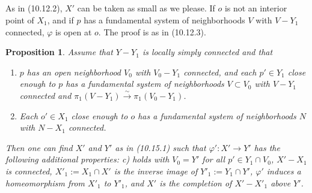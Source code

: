 \documentclass[12pt,a4paper]{article}
\theoremstyle{plain}
\newtheorem{proposition}[theorem]{Proposition}
\theoremstyle{definition}
\theoremstyle{remark}
\begin{document}
\subsection{}
\label{10.15.2}

As in (10.12.2), $X'$ can be taken as small as we please. If $o$ is not an interior point of $X_1$, and if $p$ has a fundamental system of neighborhoods $V$ with $V - Y_1$ connected, $\varphi$ is open at $o$. The proof is as in (10.12.3).

\begin{proposition}
\label{10.15.3}
Assume that $Y - Y_1$ is locally simply connected and that
\begin{enumerate}
\item[c)] $p$ has an open neighborhood $V_0$ with $V_0 - Y_1$ connected, and each $p' \in Y_1$ close enough to $p$ has a fundamental system of neighborhoods $V \subset V_0$ with $V - Y_1$ connected and $\pi_1(V - Y_1) \xrightarrow{\sim} \pi_1(V_0 - Y_1)$.
\item[d)] Each $o' \in X_1$ close enough to $o$ has a fundamental system of neighborhoods $N$ with $N - X_1$ connected.
\end{enumerate}
Then one can find $X'$ and $Y'$ as in (10.15.1) such that $\varphi' : X' \to Y'$ has the following additional properties: c) holds with $V_0 = Y'$ for all $p' \in Y_1 \cap V_0$, $X' - X_1$ is connected, $X'_1 := X_1 \cap X'$ is the inverse image of $Y'_1 := Y_1 \cap Y'$, $\varphi'$ induces a homeomorphism from $X'_1$ to $Y'_1$, and $X'$ is the completion of $X' - X'_1$ above $Y'$.
\end{proposition}
\end{document}
